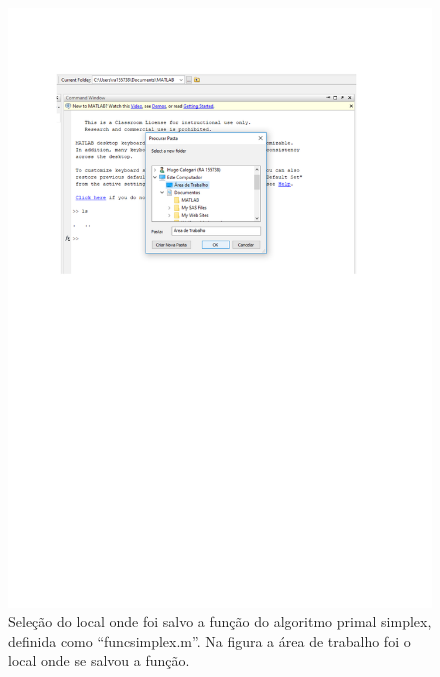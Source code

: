 \documentclass[10pt]{article}
\begin{document}
\begin{figure}[H]
    \centering
    \includegraphics[scale = 0.7]{fig3teste.pdf}
    \caption{Seleção do local onde foi salvo a função do algoritmo primal simplex, definida como ``funcsimplex.m''. Na figura a área de trabalho foi o local onde se salvou a função.}
\end{figure}
\end{document}

